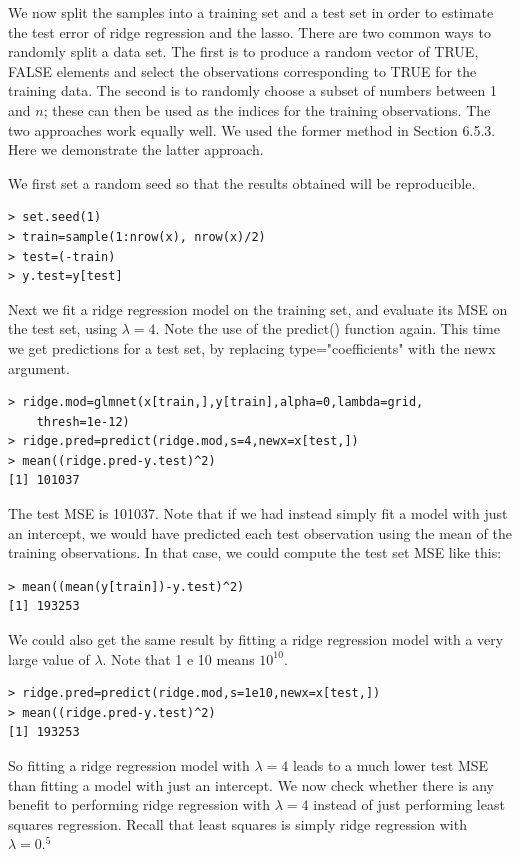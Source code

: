 \documentclass[10pt]{article}
\begin{document}
We now split the samples into a training set and a test set in order to estimate the test error of ridge regression and the lasso. There are two common ways to randomly split a data set. The first is to produce a random vector of TRUE, FALSE elements and select the observations corresponding to TRUE for the training data. The second is to randomly choose a subset of numbers between 1 and $n$; these can then be used as the indices for the training observations. The two approaches work equally well. We used the former method in Section 6.5.3. Here we demonstrate the latter approach.

We first set a random seed so that the results obtained will be reproducible.

\begin{verbatim}
> set.seed(1)
> train=sample(1:nrow(x), nrow(x)/2)
> test=(-train)
> y.test=y[test]
\end{verbatim}

Next we fit a ridge regression model on the training set, and evaluate its MSE on the test set, using $\lambda=4$. Note the use of the predict() function again. This time we get predictions for a test set, by replacing type="coefficients" with the newx argument.

\begin{verbatim}
> ridge.mod=glmnet(x[train,],y[train],alpha=0,lambda=grid,
    thresh=1e-12)
> ridge.pred=predict(ridge.mod,s=4,newx=x[test,])
> mean((ridge.pred-y.test)^2)
[1] 101037
\end{verbatim}

The test MSE is 101037. Note that if we had instead simply fit a model with just an intercept, we would have predicted each test observation using the mean of the training observations. In that case, we could compute the test set MSE like this:

\begin{verbatim}
> mean((mean(y[train])-y.test)^2)
[1] 193253
\end{verbatim}

We could also get the same result by fitting a ridge regression model with a very large value of $\lambda$. Note that 1 e 10 means $10^{10}$.

\begin{verbatim}
> ridge.pred=predict(ridge.mod,s=1e10,newx=x[test,])
> mean((ridge.pred-y.test)^2)
[1] 193253
\end{verbatim}

So fitting a ridge regression model with $\lambda=4$ leads to a much lower test MSE than fitting a model with just an intercept. We now check whether there is any benefit to performing ridge regression with $\lambda=4$ instead of just performing least squares regression. Recall that least squares is simply ridge regression with $\lambda=0 .{ }^{5}$
\end{document}
